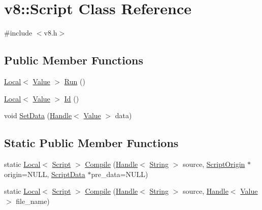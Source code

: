 \hypertarget{classv8_1_1_script}{}\section{v8\+:\+:Script Class Reference}
\label{classv8_1_1_script}


{\ttfamily \#include $<$v8.\+h$>$}

\subsection*{Public Member Functions}
\begin{DoxyCompactItemize}
\item 
\hyperlink{classv8_1_1_local}{Local}$<$ \hyperlink{classv8_1_1_value}{Value} $>$ \hyperlink{classv8_1_1_script_a5f43b29d40bd51ebad2cc275ba3898a1}{Run} ()
\item 
\hyperlink{classv8_1_1_local}{Local}$<$ \hyperlink{classv8_1_1_value}{Value} $>$ \hyperlink{classv8_1_1_script_aa25adfbb98af9179b4891e09432c2916}{Id} ()
\item 
void \hyperlink{classv8_1_1_script_a92d2d9fe3ce03316fc1433b6e4368b5d}{Set\+Data} (\hyperlink{classv8_1_1_handle}{Handle}$<$ \hyperlink{classv8_1_1_value}{Value} $>$ data)
\end{DoxyCompactItemize}
\subsection*{Static Public Member Functions}
\begin{DoxyCompactItemize}
\item 
static \hyperlink{classv8_1_1_local}{Local}$<$ \hyperlink{classv8_1_1_script}{Script} $>$ \hyperlink{classv8_1_1_script_a9c1a035de382abb86de8468baa62f8ab}{Compile} (\hyperlink{classv8_1_1_handle}{Handle}$<$ \hyperlink{classv8_1_1_string}{String} $>$ source, \hyperlink{classv8_1_1_script_origin}{Script\+Origin} $\ast$origin=N\+U\+L\+L, \hyperlink{classv8_1_1_script_data}{Script\+Data} $\ast$pre\+\_\+data=N\+U\+L\+L)
\item 
static \hyperlink{classv8_1_1_local}{Local}$<$ \hyperlink{classv8_1_1_script}{Script} $>$ \hyperlink{classv8_1_1_script_a0c56436bbe2b71753e1413bab1f04a6e}{Compile} (\hyperlink{classv8_1_1_handle}{Handle}$<$ \hyperlink{classv8_1_1_string}{String} $>$ source, \hyperlink{classv8_1_1_handle}{Handle}$<$ \hyperlink{classv8_1_1_value}{Value} $>$ file\+\_\+name)
\end{DoxyCompactItemize}


